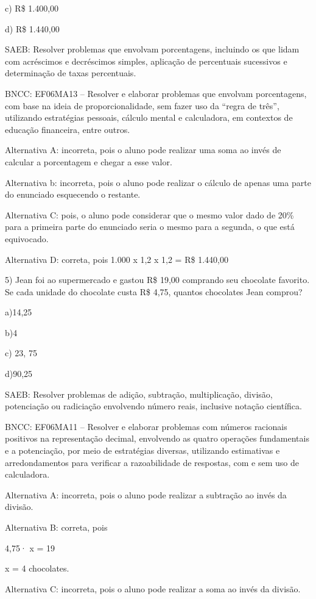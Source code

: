 c) R\$ 1.400,00

d) R\$ 1.440,00

SAEB: Resolver problemas que envolvam porcentagens, incluindo os que
lidam com acréscimos e decréscimos simples, aplicação de percentuais
sucessivos e determinação de taxas percentuais.

BNCC: EF06MA13 -- Resolver e elaborar problemas que envolvam
porcentagens, com base na ideia de proporcionalidade, sem fazer uso da
``regra de três'', utilizando estratégias pessoais, cálculo mental e
calculadora, em contextos de educação financeira, entre outros.

Alternativa A: incorreta, pois o aluno pode realizar uma soma ao invés
de calcular a porcentagem e chegar a esse valor.

Alternativa b: incorreta, pois o aluno pode realizar o cálculo de apenas
uma parte do enunciado esquecendo o restante.

Alternativa C: pois, o aluno pode considerar que o mesmo valor dado de
20\% para a primeira parte do enunciado seria o mesmo para a segunda, o
que está equivocado.

Alternativa D: correta, pois 1.000 x 1,2 x 1,2 = R\$ 1.440,00

5) Jean foi ao supermercado e gastou R\$ 19,00 comprando seu chocolate
favorito. Se cada unidade do chocolate custa R\$ 4,75, quantos
chocolates Jean comprou?

a)14,25

b)4

c) 23, 75

d)90,25

SAEB: Resolver problemas de adição, subtração, multiplicação, divisão,
potenciação ou radiciação envolvendo número reais, inclusive notação
científica.

BNCC: EF06MA11 -- Resolver e elaborar problemas com números racionais
positivos na representação decimal, envolvendo as quatro operações
fundamentais e a potenciação, por meio de estratégias diversas,
utilizando estimativas e arredondamentos para verificar a razoabilidade
de respostas, com e sem uso de calculadora.

Alternativa A: incorreta, pois o aluno pode realizar a subtração ao
invés da divisão.

Alternativa B: correta, pois

4,75· x = 19

x = 4 chocolates.

Alternativa C: incorreta, pois o aluno pode realizar a soma ao invés da
divisão.

